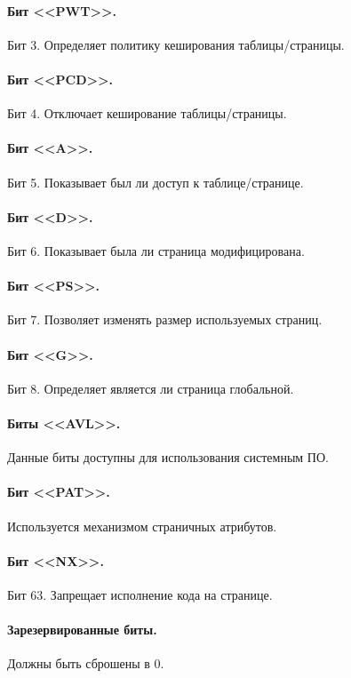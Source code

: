 \paragraph{Бит <<PWT>>.} Бит 3. Определяет политику кеширования таблицы/страницы.

\paragraph{Бит <<PCD>>.} Бит 4. Отключает кеширование таблицы/страницы.

\paragraph{Бит <<A>>.} Бит 5. Показывает был ли доступ к таблице/странице.

\paragraph{Бит <<D>>.} Бит 6. Показывает была ли страница модифицирована.

\paragraph{Бит <<PS>>.} Бит 7. Позволяет изменять размер используемых страниц.

\paragraph{Бит <<G>>.} Бит 8. Определяет является ли страница глобальной.

\paragraph{Биты <<AVL>>.} Данные биты доступны для использования системным ПО.

\paragraph{Бит <<PAT>>.} Используется механизмом страничных атрибутов.

\paragraph{Бит <<NX>>.} Бит 63. Запрещает исполнение кода на странице.

\paragraph{Зарезервированные биты.} Должны быть сброшены в 0.

